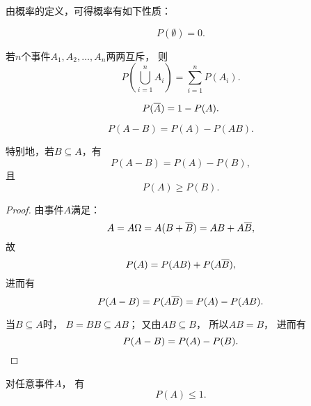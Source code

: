 由概率的定义，可得概率有如下性质：
\begin{property}
\begin{equation}
	P(\emptyset) = 0.
\end{equation}
\end{property}

\begin{property}[有限可加性]
若\(n\)个事件\(A_1,A_2,\dotsc,A_n\)两两互斥，
则\begin{equation}
	P\left(\bigcup_{i=1}^n A_i\right)
	= \sum_{i=1}^n P(A_i).
\end{equation}
\end{property}

\begin{property}
\begin{equation}
	P(\SetComplementaryL{A}) = 1 - P(A).
\end{equation}
\end{property}

\begin{property}[概率的减法]
\begin{equation}
	P(A - B) = P(A) - P(AB).
\end{equation}

特别地，若\(B \subseteq A\)，有
\begin{equation}
	P(A - B) = P(A) - P(B),
\end{equation}
且
\begin{equation}
	P(A) \geq P(B).
\end{equation}
\begin{proof}
由事件\(A\)满足：\begin{equation*}
	A = A \Omega
	= A(B+\SetComplementaryL{B})
	= AB+A\SetComplementaryL{B},
\end{equation*}
故\begin{equation*}
	P(A) = P(AB)+P(A\SetComplementaryL{B}),
\end{equation*}
进而有\begin{equation*}
	P(A-B) = P(A\SetComplementaryL{B}) = P(A) - P(AB).
\end{equation*}

当\(B \subseteq A\)时，
\(B = BB \subseteq AB\)；
又由\(AB \subseteq B\)，
所以\(AB = B\)，
进而有\begin{equation*}
	P(A-B) = P(A) - P(B).
	\qedhere
\end{equation*}
\end{proof}
\end{property}

\begin{property}
对任意事件\(A\)，
有\begin{equation}
	P(A) \leq 1.
\end{equation}
\end{property}

